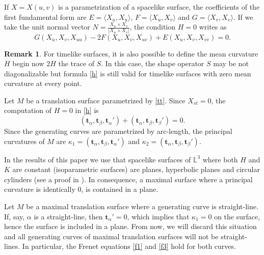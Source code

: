 \documentclass[a4paper,12pt]{amsart}
\numberwithin{equation}{section}
\theoremstyle{definition}
\newtheorem{remark}[theorem]{Remark}
\def\rr{\mathbb L}
\def\t{\mathbf t}
\begin{document}
  
If $X=X(u,v)$ is a parametrization of a spacelike surface, the coefficients of the first fundamental form are $E=\langle X_u,X_u\rangle$, $F=\langle X_u,X_v\rangle$ and $G=\langle X_v,X_v\rangle$. If we take the unit normal vector $N=\frac{X_u\times X_v}{|X_u\times X_v|}$, the condition $H=0$ writes as 
\begin{equation}\label{h}
G(X_u,X_v,X_{uu})-2F(X_u,X_v,X_{uv})+E(X_u,X_v,X_{vv})=0.
\end{equation}

\begin{remark}  For timelike surfaces, it is also possible to define the mean curvature $H$ begin now $2H$ the trace of $S$. In this case, the shape operator $S$ may be not diagonalizable but formula \eqref{h} is still valid for timelike surfaces with zero mean curvature at every point.    
\end{remark}


Let $M$ be   a  translation surface parametrized by \eqref{tt}. Since $X_{st}=0$, the computation of  $H=0$ in \eqref{h} is  
\begin{equation}\label{eq1}
 (\t_\alpha,\t_\beta,\t_\alpha')+(\t_\alpha,\t_\beta,\t_\beta')=0.
\end{equation}
Since the generating curves  are parametrized by arc-length, the principal curvatures of $M$ are $\kappa_1=(\t_\alpha,\t_\beta,\t_\alpha')$ and $\kappa_2=(\t_\alpha,\t_\beta,\t_\beta')$. 
 
 
 In the results of this paper we use that spacelike surfaces of $\rr^3$ where  both $H$ and $K$ are constant (isoparametric surfaces) are  planes, hyperbolic planes and circular cylinders (see a proof in \cite{lo22}). In consequence, a maximal surface where a principal curvature is identically $0$,  is contained  in a plane. 
 
 Let $M$ be a maximal translation surface where a generating curve is straight-line. If, say, $\alpha$ is a straight-line, then $\t_\alpha'=0$, which implies that $\kappa_1=0$ on the surface, hence the surface is included in a plane.   From now, we will discard this situation and all generating curves of maximal translation surfaces will not be straight-lines. In particular, the Frenet equations \eqref{f1} and \eqref{f3} hold for both curves.
 
\end{document}
